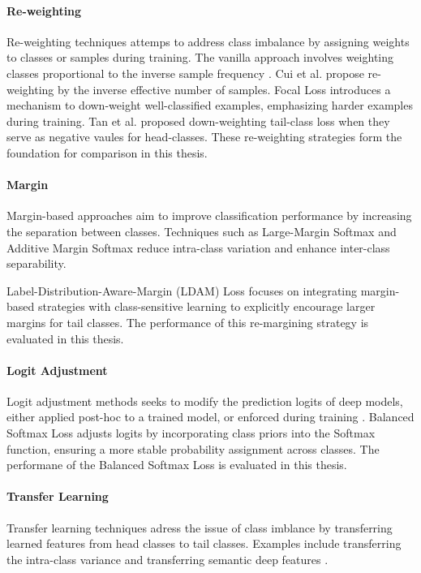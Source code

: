 \paragraph{Re-weighting}
Re-weighting techniques attemps to address class imbalance by assigning weights to classes or samples during training. The vanilla approach involves weighting classes proportional to the inverse sample frequency \cite{zhang2023deep}. Cui et al. \cite{cui2019classbalancedlossbasedeffective} propose re-weighting by the inverse effective number of samples. Focal Loss \cite{lin2018focallossdenseobject} introduces a mechanism to down-weight well-classified examples, emphasizing harder examples during training. Tan et al. \cite{tan2020equalizationlosslongtailedobject} proposed down-weighting tail-class loss when they serve as negative vaules for head-classes. These re-weighting strategies form the foundation for comparison in this thesis.

\paragraph{Margin}
Margin-based approaches aim to improve classification performance by increasing the separation between classes. Techniques such as Large-Margin Softmax \cite{liu2017largemarginsoftmaxlossconvolutional} and Additive Margin Softmax \cite{Wang_2018} reduce intra-class variation and enhance inter-class separability.

Label-Distribution-Aware-Margin (LDAM) Loss \cite{cao2019learningimbalanceddatasetslabeldistributionaware} focuses on integrating margin-based strategies with class-sensitive learning to explicitly encourage larger margins for tail classes. The performance of this re-margining strategy is evaluated in this thesis.

\paragraph{Logit Adjustment}
Logit adjustment methods seeks to modify the prediction logits of deep models, either applied post-hoc to a trained model, or enforced during training \cite{menon2021longtaillearninglogitadjustment}. Balanced Softmax Loss \cite{ren2020balancedmetasoftmaxlongtailedvisual} adjusts logits by incorporating class priors into the Softmax function, ensuring a more stable probability assignment across classes. The performane of the Balanced Softmax Loss is evaluated in this thesis.

\paragraph{Transfer Learning}
Transfer learning techniques adress the issue of class imblance by transferring learned features from head classes to tail classes. Examples include transferring the intra-class variance \cite{yin2019featuretransferlearningdeep} and transferring semantic deep features \cite{liu2019largescalelongtailedrecognitionopen}.

